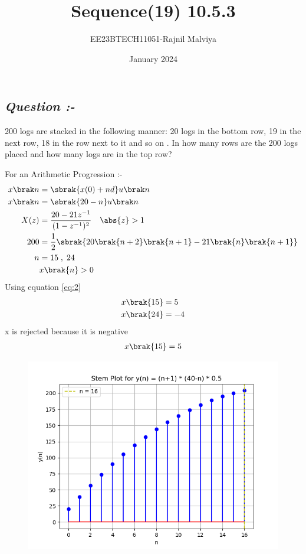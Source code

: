 \documentclass[journal,12pt,twocolumn]{IEEEtran}
\theoremstyle{remark}
\begin{document}
\title{Sequence(19) 10.5.3}
\author{EE23BTECH11051-Rajnil Malviya}
\date{January 2024}
\maketitle
\subsection*{\textit{Question :-}}
200 logs are stacked in the following manner: 20 logs in the bottom row, 19 in the next row,
18 in the row next to it and so on . In how many rows are the 200 logs placed
and how many logs are in the top row?

\begin{table}[h!]
   
        
       
    \end{table}
For an Arithmetic Progression :-
\begin{align}x\brak n&=\sbrak {x(0)+n d} u \brak n \label{eq:1}\\
x\brak n&=\sbrak{20-n} u \brak n \label{eq:2}\\
 X(z)&=\frac{20-21z^{-1}}{(1 - z^{-1})^2}  \quad \abs{ z} > 1 \label{eq:3}\\
  200 &=\frac{1}{2}\sbrak{20\brak{n+2}\brak{n+1}-21\brak{n}\brak{n+1}} \label{eq:4}\\
   n &=15\; ,\;24 \label{eq:5}\\
 & x\brak{n}>0 \label{eq:6}
 \end{align}
Using equation \eqref{eq:2}
\begin{align} &x\brak{15}=5 \label{eq:7}\\
 &x\brak{24}=-4 \label{eq:8} \end{align}
x is rejected because it is negative
\begin{align}x\brak{15}=5\end{align}
\newpage
\begin{figure}
   \includegraphics[width=1\linewidth]{figs/f2.png}
\end{figure}
\end{document}
